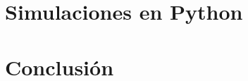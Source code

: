 \documentclass[11pt]{article}
\begin{document}
\section{Simulaciones en Python}


\section{Conclusión}


%

\clearpage
\newpage
%
\end{document}
